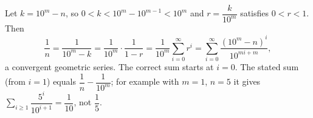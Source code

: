 Let $k=10^m-n$, so $0<k<10^m-10^{m-1}<10^m$ and $r=\dfrac k{10^m}$ satisfies $0<r<1$. Then
\[\dfrac1n=\dfrac1{10^m-k}=\dfrac1{10^m}\cdot\dfrac1{1-r}=\dfrac1{10^m}\sum_{i=0}^{\infty}r^i=\sum_{i=0}^\infty\dfrac{(10^m-n)^i}{10^{mi+m}},\]
a convergent geometric series. The correct sum starts at $i=0$. The stated sum (from $i=1$) equals $\dfrac1n-\dfrac1{10^m}$; for example with $m=1$, $n=5$ it gives $\sum_{i\ge1}\dfrac{5^i}{10^{i+1}}=\dfrac1{10}$, not $\dfrac15$.

